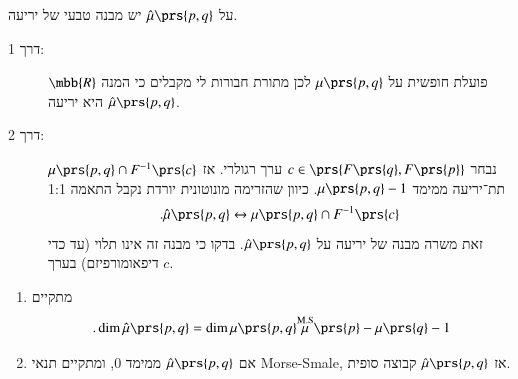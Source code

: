 \documentclass[a4paper,10pt,twoside,openany]{book}
\begin{document}
\begin{exercise}
על
$\hat{\mu}\prs{p,q}$
יש מבנה טבעי של יריעה.
\end{exercise}

\begin{solution}
\begin{description}
\item[דרך 1:] $\mbb{R}$
פועלת חופשית על
$\mu\prs{p,q}$
לכן מתורת חבורות לי מקבלים כי המנה
$\hat{\mu}\prs{p,q}$
היא יריעה.

\item[דרך 2:]
נבחר
$c \in \prs{F\prs{q}, F\prs{p}}$
ערך רגולרי. אז
$\mu\prs{p,q} \cap F^{-1}\prs{c}$
תת־יריעה ממימד
$\mu\prs{p,q} - 1$.
כיוון שהזרימה מונוטונית יורדת נקבל התאמה 1:1
\[\text{.} \hat{\mu}\prs{p,q} \leftrightarrow \mu\prs{p,q} \cap F^{-1}\prs{c}\]
זאת משרה מבנה של יריעה על
$\hat{\mu}\prs{p,q}$.
בדקו כי מבנה זה אינו תלוי (עד כדי דיפאומורפיזם) בערך
$c$.
\end{description}
\end{solution}

\begin{exercise}
\begin{enumerate}
\item מתקיים
\[\text{.} \dim \hat{\mu}\prs{p,q} = \dim \mu\prs{p,q} \overset{\text{M.S}} \mu\prs{p} - \mu\prs{q} - 1\]

\item אם
$\hat{\mu}\prs{p,q}$
ממימד
$0$,
ומתקיים תנאי
\textenglish{Morse-Smale},
אז
$\hat{\mu}\prs{p,q}$
קבוצה סופית.
\end{enumerate}
\end{exercise}
\end{document}
